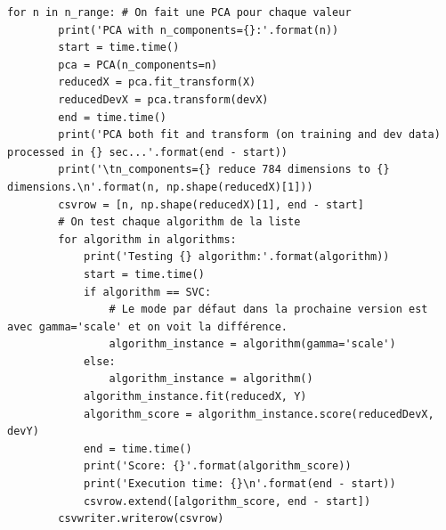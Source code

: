 \documentclass[12pt,a4paper]{article}
\begin{document}
{\begin{lstlisting}[style=darkula]
	for n in n_range: # On fait une PCA pour chaque valeur
		print('PCA with n_components={}:'.format(n))
		start = time.time()
		pca = PCA(n_components=n)
		reducedX = pca.fit_transform(X)
		reducedDevX = pca.transform(devX)
		end = time.time()
		print('PCA both fit and transform (on training and dev data) processed in {} sec...'.format(end - start))
		print('\tn_components={} reduce 784 dimensions to {} dimensions.\n'.format(n, np.shape(reducedX)[1]))
		csvrow = [n, np.shape(reducedX)[1], end - start]
		# On test chaque algorithm de la liste
		for algorithm in algorithms: 
			print('Testing {} algorithm:'.format(algorithm))
			start = time.time()
			if algorithm == SVC:
				# Le mode par défaut dans la prochaine version est avec gamma='scale' et on voit la différence.
				algorithm_instance = algorithm(gamma='scale')
			else:
				algorithm_instance = algorithm()
			algorithm_instance.fit(reducedX, Y)
			algorithm_score = algorithm_instance.score(reducedDevX, devY)
			end = time.time()
			print('Score: {}'.format(algorithm_score))
			print('Execution time: {}\n'.format(end - start))
			csvrow.extend([algorithm_score, end - start])
		csvwriter.writerow(csvrow)
\end{lstlisting}

}
\end{document}
